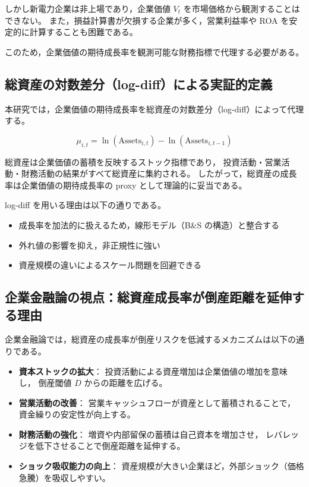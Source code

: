 しかし新電力企業は非上場であり，企業価値 $V_t$ を市場価格から観測することはできない。
また，損益計算書が欠損する企業が多く，営業利益率や ROA を安定的に計算することも困難である。

このため，企業価値の期待成長率を観測可能な財務指標で代理する必要がある。

\subsection{総資産の対数差分（log-diff）による実証的定義}

本研究では，企業価値の期待成長率を総資産の対数差分（log-diff）によって代理する。



\[
\mu_{i,t}
= \ln(\mathrm{Assets}_{i,t}) - \ln(\mathrm{Assets}_{i,t-1})
\]



総資産は企業価値の蓄積を反映するストック指標であり，
投資活動・営業活動・財務活動の結果がすべて総資産に集約される。
したがって，総資産の成長率は企業価値の期待成長率の proxy として理論的に妥当である。

log-diff を用いる理由は以下の通りである。

\begin{itemize}
    \item 成長率を加法的に扱えるため，線形モデル（B\&S の構造）と整合する
    \item 外れ値の影響を抑え，非正規性に強い
    \item 資産規模の違いによるスケール問題を回避できる
\end{itemize}

\subsection{企業金融論の視点：総資産成長率が倒産距離を延伸する理由}

企業金融論では，総資産の成長率が倒産リスクを低減するメカニズムは以下の通りである。

\begin{itemize}
    \item \textbf{資本ストックの拡大}：
          投資活動による資産増加は企業価値の増加を意味し，
          倒産閾値 $D$ からの距離を広げる。
    \item \textbf{営業活動の改善}：
          営業キャッシュフローが資産として蓄積されることで，
          資金繰りの安定性が向上する。
    \item \textbf{財務活動の強化}：
          増資や内部留保の蓄積は自己資本を増加させ，
          レバレッジを低下させることで倒産距離を延伸する。
    \item \textbf{ショック吸収能力の向上}：
          資産規模が大きい企業ほど，外部ショック（価格急騰）を吸収しやすい。
\end{itemize}

